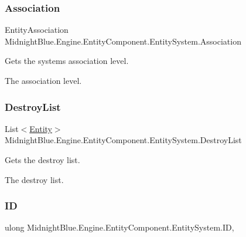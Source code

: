 \subsubsection{\texorpdfstring{Association}{Association}}
{\footnotesize\ttfamily Entity\+Association Midnight\+Blue.\+Engine.\+Entity\+Component.\+Entity\+System.\+Association\hspace{0.3cm}{\ttfamily [get]}}



Gets the systems association level. 

The association level.\hypertarget{class_midnight_blue_1_1_engine_1_1_entity_component_1_1_entity_system_a4f65ada9bcabd5a953e05e5567c83ca9}{}\label{class_midnight_blue_1_1_engine_1_1_entity_component_1_1_entity_system_a4f65ada9bcabd5a953e05e5567c83ca9} 
\subsubsection{\texorpdfstring{Destroy\+List}{DestroyList}}
{\footnotesize\ttfamily List$<$\hyperlink{class_midnight_blue_1_1_engine_1_1_entity_component_1_1_entity}{Entity}$>$ Midnight\+Blue.\+Engine.\+Entity\+Component.\+Entity\+System.\+Destroy\+List\hspace{0.3cm}{\ttfamily [get]}}



Gets the destroy list. 

The destroy list.\hypertarget{class_midnight_blue_1_1_engine_1_1_entity_component_1_1_entity_system_ada441a647ad7b51e9a95dbfd1b309271}{}\label{class_midnight_blue_1_1_engine_1_1_entity_component_1_1_entity_system_ada441a647ad7b51e9a95dbfd1b309271} 
\subsubsection{\texorpdfstring{ID}{ID}}
{\footnotesize\ttfamily ulong Midnight\+Blue.\+Engine.\+Entity\+Component.\+Entity\+System.\+ID\hspace{0.3cm}{\ttfamily [get]}, {\ttfamily [set]}}



